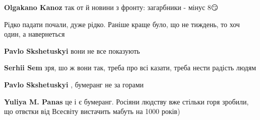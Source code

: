 \begin{itemize}
\begin{itemize}
\textbf{Olgakano Kanoz} так от й новини з фронту: загарбники - мінус 8😏
\end{itemize}


Рідко падати почали, дуже рідко. Раніше краще було, що не тиждень, то хоч один,
а навернеться

\begin{itemize}
 
\textbf{Pavlo Skshetuskyi} вони не все показують

\begin{itemize}
 
\textbf{Serhii Sem} зря, шо ж вони так, треба про всі казати, треба нести радість людям
\end{itemize}

 
\textbf{Pavlo Skshetuskyi} , бумеранг не за горами

\begin{itemize}
 
\textbf{Yuliya M. Panas} це і є бумеранг. Росіяни людству вже стільки горя зробили, що отвєтки від Всесвіту вистачить мабуть на 1000 років)

 

\end{itemize}
\end{itemize}
\end{itemize}
